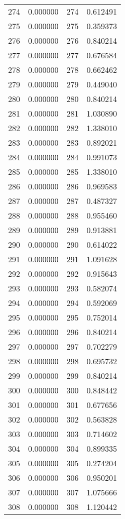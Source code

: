 \documentclass[12pt]{article}
\begin{document}
\begin{longtable}{@{}cccc@{}}
274 & 0.000000 & 274 & 0.612491 \\
275 & 0.000000 & 275 & 0.359373 \\
276 & 0.000000 & 276 & 0.840214 \\
277 & 0.000000 & 277 & 0.676584 \\
278 & 0.000000 & 278 & 0.662462 \\
279 & 0.000000 & 279 & 0.449040 \\
280 & 0.000000 & 280 & 0.840214 \\
281 & 0.000000 & 281 & 1.030890 \\
282 & 0.000000 & 282 & 1.338010 \\
283 & 0.000000 & 283 & 0.892021 \\
284 & 0.000000 & 284 & 0.991073 \\
285 & 0.000000 & 285 & 1.338010 \\
286 & 0.000000 & 286 & 0.969583 \\
287 & 0.000000 & 287 & 0.487327 \\
288 & 0.000000 & 288 & 0.955460 \\
289 & 0.000000 & 289 & 0.913881 \\
290 & 0.000000 & 290 & 0.614022 \\
291 & 0.000000 & 291 & 1.091628 \\
292 & 0.000000 & 292 & 0.915643 \\
293 & 0.000000 & 293 & 0.582074 \\
294 & 0.000000 & 294 & 0.592069 \\
295 & 0.000000 & 295 & 0.752014 \\
296 & 0.000000 & 296 & 0.840214 \\
297 & 0.000000 & 297 & 0.702279 \\
298 & 0.000000 & 298 & 0.695732 \\
299 & 0.000000 & 299 & 0.840214 \\
300 & 0.000000 & 300 & 0.848442 \\
301 & 0.000000 & 301 & 0.677656 \\
302 & 0.000000 & 302 & 0.563828 \\
303 & 0.000000 & 303 & 0.714602 \\
304 & 0.000000 & 304 & 0.899335 \\
305 & 0.000000 & 305 & 0.274204 \\
306 & 0.000000 & 306 & 0.950201 \\
307 & 0.000000 & 307 & 1.075666 \\
308 & 0.000000 & 308 & 1.120442 \\

\end{longtable}
\end{document}
